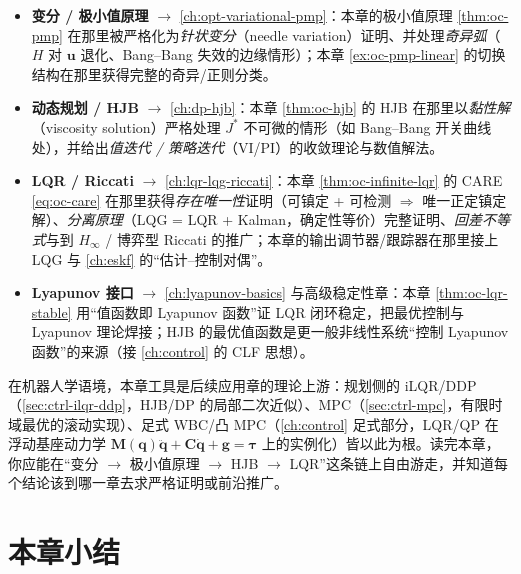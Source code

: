 \begin{itemize}
  \item \textbf{变分 / 极小值原理} $\to$ \cref{ch:opt-variational-pmp}：本章的极小值原理 \cref{thm:oc-pmp} 在那里被严格化为\emph{针状变分}（needle variation）证明、并处理\emph{奇异弧}（$H$ 对 $\mathbf u$ 退化、Bang--Bang 失效的边缘情形）；本章 \cref{ex:oc-pmp-linear} 的切换结构在那里获得完整的奇异/正则分类。
  \item \textbf{动态规划 / HJB} $\to$ \cref{ch:dp-hjb}：本章 \cref{thm:oc-hjb} 的 HJB 在那里以\emph{黏性解}（viscosity solution）严格处理 $J^*$ 不可微的情形（如 Bang--Bang 开关曲线处），并给出\emph{值迭代 / 策略迭代}（VI/PI）的收敛理论与数值解法。
  \item \textbf{LQR / Riccati} $\to$ \cref{ch:lqr-lqg-riccati}：本章 \cref{thm:oc-infinite-lqr} 的 CARE \cref{eq:oc-care} 在那里获得\emph{存在唯一性}证明（可镇定 + 可检测 $\Rightarrow$ 唯一正定镇定解）、\emph{分离原理}（LQG = LQR + Kalman，确定性等价）完整证明、\emph{回差不等式}与到 $H_\infty$ / 博弈型 Riccati 的推广；本章的输出调节器/跟踪器在那里接上 LQG 与 \cref{ch:eskf} 的“估计--控制对偶”。
  \item \textbf{Lyapunov 接口} $\to$ \cref{ch:lyapunov-basics} 与高级稳定性章：本章 \cref{thm:oc-lqr-stable} 用“值函数即 Lyapunov 函数”证 LQR 闭环稳定，把最优控制与 Lyapunov 理论焊接；HJB 的最优值函数是更一般非线性系统“控制 Lyapunov 函数”的来源（接 \cref{ch:control} 的 CLF 思想）。
\end{itemize}

\noindent 在机器人学语境，本章工具是后续应用章的理论上游：规划侧的 iLQR/DDP（\cref{sec:ctrl-ilqr-ddp}，HJB/DP 的局部二次近似）、MPC（\cref{sec:ctrl-mpc}，有限时域最优的滚动实现）、足式 WBC/凸 MPC（\cref{ch:control} 足式部分，LQR/QP 在浮动基座动力学 $\mathbf M(\mathbf q)\ddot{\mathbf q}+\mathbf C\dot{\mathbf q}+\mathbf g=\boldsymbol\tau$ 上的实例化）皆以此为根。读完本章，你应能在“变分 $\to$ 极小值原理 $\to$ HJB $\to$ LQR”这条链上自由游走，并知道每个结论该到哪一章去求严格证明或前沿推广。

\section*{本章小结}

